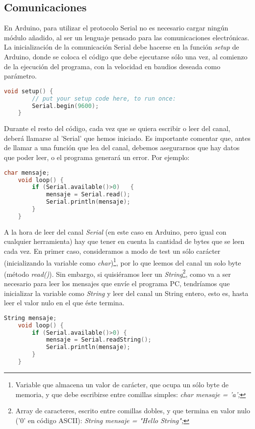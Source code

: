 \subsection{Comunicaciones}\label{subsec:ComunicacionesArduino}
En Arduino, para utilizar el protocolo Serial no es necesario cargar ningún módulo añadido, al ser un lenguaje pensado para las comunicaciones electrónicas. La inicialización de la comunicación Serial debe hacerse en la función \textit{setup} de Arduino, donde se coloca el código que debe ejecutarse sólo una vez, al comienzo de la ejecución del programa, con la velocidad en baudios deseada como parámetro.
\begin{lstlisting}[language=C,caption={Inicialización del protocolo Serial}]
	void setup() {
		// put your setup code here, to run once:
		Serial.begin(9600);
	}
\end{lstlisting}
Durante el resto del código, cada vez que se quiera escribir o leer del canal, deberá llamarse al 'Serial' que hemos iniciado. Es importante comentar que, antes de llamar a una función que lea del canal, debemos asegurarnos que hay datos que poder leer, o el programa generará un error. Por ejemplo:
\begin{lstlisting}[language=C,caption={Eco en Arduino: lee del canal Serial solo si hay datos para leer y lo escribe}]
	char mensaje;
	void loop() {
		if (Serial.available()>0)	{
			mensaje = Serial.read();   
			Serial.println(mensaje);
		}
	}
\end{lstlisting}
A la hora de leer del canal \textit{Serial} (en este caso en Arduino, pero igual con cualquier herramienta) hay que tener en cuenta la cantidad de bytes que se leen cada vez. En primer caso, consideramos a modo de test un sólo carácter (inicializando la variable como \textit{char})\footnote{Variable que almacena un valor de carácter, que ocupa un sólo byte de memoria, y que debe escribirse entre comillas simples:\textit{ char mensaje = 'a';}}, por lo que leemos del canal un solo byte (método \textit{read()}). Sin embargo, si quisiéramos leer un \textit{String}\footnote{Array de caracteres, escrito entre comillas dobles, y que termina en valor nulo ('0' en código ASCII): \textit{String mensaje =  "Hello String";}}, como va a ser necesario para leer los mensajes que envíe el programa PC, tendríamos que inicializar la variable como \textit{String} y leer del canal un String entero, esto es, hasta leer el valor nulo en el que éste termina.
\begin{lstlisting}[language=C,caption={Eco en Arduino con un String}]
	String mensaje;
	void loop() {
		if (Serial.available()>0) {
			mensaje = Serial.readString();     
			Serial.println(mensaje);
		}
	}
\end{lstlisting}

